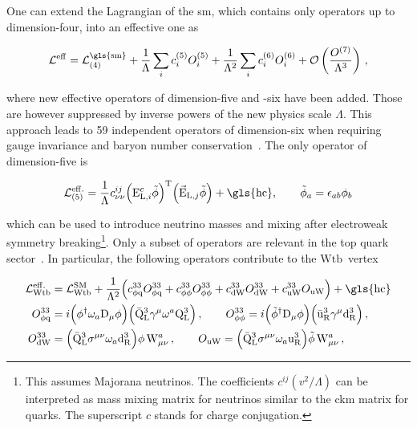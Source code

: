 One can extend the Lagrangian of the \gls{sm}, which contains only operators up to dimension-four, into an effective one as

\begin{equation}
\mathcal{L}^\mathrm{eff}=\mathcal{L}^\mathrm{\gls{sm}}_\mathrm{(4)}+\frac{1}{\Lambda}\sum_{i}c_{i}^\mathrm{(5)}{O}_{i}^\mathrm{(5)}+\frac{1}{\Lambda^{2}}\sum_{i}c_{i}^\mathrm{(6)}{O}_{i}^\mathrm{(6)}+\mathcal{O}\left(\frac{O^\mathrm{(7)}}{\Lambda^3}\right)\,,
\end{equation}

where new effective operators of dimension-five and -six have been added. Those are however suppressed by inverse powers of the new physics scale $\Lambda$. This approach leads to 59 independent operators of dimension-six when requiring gauge invariance and baryon number conservation~\cite{Grzadkowski:2010es}. The only operator of dimension-five is

\begin{equation}
\mathcal{L}^\mathrm{eff.}_\mathrm{(5)}=\frac{1}{\Lambda}c^{ij}_{\nu\nu}\Big({\mathrm{E}}^{c}_{\mathrm{L},i}\tilde{\phi}\Big)^\mathrm{T}\Big(\vec{\mathrm{E}}_{\mathrm{L},j}\tilde{\phi}\Big)+\mathrm{\gls{hc}},\qquad \tilde{\phi}_{a}=\epsilon_{ab}\phi_{b}
\end{equation}

which can be used to introduce neutrino masses and mixing after electroweak symmetry breaking\footnote{This assumes Majorana neutrinos. The coefficients $c^{ij}(v^2/\Lambda)$ can be interpreted as mass mixing matrix for neutrinos similar to the \gls{ckm} matrix for quarks. The superscript $c$ stands for charge conjugation.}. Only a subset of operators are relevant in the top quark sector~\cite{AguilarSaavedra:2008zc}. In particular, the following operators contribute to the $\mathrm{Wtb}$~vertex


\begin{subequations}\label{eq:theory-eft-lagrangian-operators}
\begin{align}
\mathcal{L}^\mathrm{eff.}_\mathrm{Wtb}&=\mathcal{L}^\mathrm{SM}_\mathrm{Wtb}+\frac{1}{\Lambda^2}\Big(c_{\phi\mathrm{q}}^{33}O_{\phi\mathrm{q}}^{33}+c_{\phi\phi}^{33}O_{\phi\phi}^{33}+c_{\mathrm{dW}}^{33}O_{\mathrm{dW}}^{33}+c_{\mathrm{uW}}^{33}O_{\mathrm{uW}}\Big)+\mathrm{\gls{hc}} \\ 
O_{\phi\mathrm{q}}^{33}&=i\Big(\phi^\dagger\omega_{a}\mathrm{D}_\mu\phi\Big)\Big(\bar{\mathrm{Q}}_\mathrm{L}^{3}\gamma^{\mu}\omega^{a}\mathrm{Q}_\mathrm{L}^{3}\Big)\,,\qquad
O_{\phi\phi}^{33}=i\Big(\tilde{\phi}^\dagger\mathrm{D}_\mu\phi\Big)\Big(\bar{\mathrm{u}}_\mathrm{R}^{3}\gamma^{\mu}\mathrm{d}_\mathrm{R}^{3}\Big)\,,\\
O_{\mathrm{dW}}^{33}&=\Big(\bar{\mathrm{Q}}_\mathrm{L}^{3}\sigma^{\mu\nu}\omega_{a}\mathrm{d}_\mathrm{R}^{3}\Big)\phi\,\mathrm{W}^{a}_{\mu\nu}\,,\qquad
O_{\mathrm{uW}}=\Big(\bar{\mathrm{Q}}_\mathrm{L}^{3}\sigma^{\mu\nu}\omega_{a}\mathrm{u}_\mathrm{R}^{3}\Big)\tilde{\phi}\,\mathrm{W}^{a}_{\mu\nu}\,,
\end{align}
\end{subequations}

